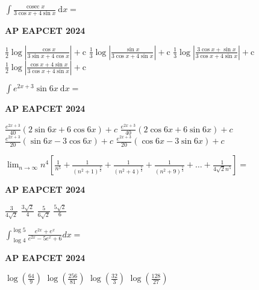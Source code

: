 \documentclass[11pt,paper=a4,answers]{exam}
\begin{document}
\begin{multicols}{2}
\begin{questions}
\question
$\int \frac{\operatorname{cosec} x}{3 \cos x+4 \sin x} \mathrm{~d} x=$
\begin{flushright}
\small\textbf{AP EAPCET 2024}
\end{flushright}
\begin{choices}
  \choice $\frac{1}{2} \log \left|\frac{\cos x}{3 \sin x+4 \cos x}\right|+\mathrm{c}$
  \choice $\frac{1}{3} \log \left|\frac{\sin x}{3 \cos x+4 \sin x}\right|+\mathrm{c}$ 
  \choice $\frac{1}{3} \log \left|\frac{3 \cos x+\sin x}{3 \cos x+4 \sin x}\right|+\mathrm{c} $ 
  \choice $\frac{1}{2} \log \left|\frac{\cos x+4 \sin x}{3 \cos x+4 \sin x}\right|+\mathrm{c}$
\end{choices}


\question
$\int e^{2 x+3} \sin 6 x \mathrm{~d} x=$
\begin{flushright}
\small\textbf{AP EAPCET 2024}
\end{flushright}
\begin{choices}
  \choice $\frac{e^{2 x+3}}{40}(2 \sin 6 x+6 \cos 6 x)+c$
  \choice $\frac{e^{2 x+3}}{40}(2 \cos 6 x+6 \sin 6 x)+c$ 
  \choice $\frac{e^{2 x+3}}{20}(\sin 6 x-3 \cos 6 x)+c$ 
  \choice $\frac{e^{2 x+3}}{20}(\cos 6 x-3 \sin 6 x)+c$
\end{choices}


\question
$\lim _{n \rightarrow \infty} n^4\left[\frac{1}{n^5}+\frac{1}{\left(n^2+1\right)^{\frac{5}{2}}}+\frac{1}{\left(n^2+4\right)^{\frac{5}{2}}}+\frac{1}{\left(n^2+9\right)^{\frac{5}{2}}}+\ldots+\frac{1}{4 \sqrt{2} n^5}\right]=$
\begin{flushright}
\small\textbf{AP EAPCET 2024}
\end{flushright}
\begin{choices}
  \choice $\frac{3}{4 \sqrt{2}}$
  \choice $\frac{3 \sqrt{2}}{4}$ 
  \choice $\frac{5}{6 \sqrt{2}}$ 
  \choice $\frac{5 \sqrt{2}}{6}$
\end{choices}

\question
$\int_{\log 4}^{\log 5} \frac{e^{2 x}+e^x}{e^{2 x}-5 e^x+6} d x=$
\begin{flushright}
\small\textbf{AP EAPCET 2024}
\end{flushright}
\begin{choices}
  \choice $ \log \left(\frac{64}{9}\right)$
  \choice $\log \left(\frac{256}{81}\right)$ 
  \choice $ \log \left(\frac{32}{3}\right)$ 
  \choice $\log \left(\frac{128}{27}\right)$
\end{choices}


\end{questions}
\end{multicols}
\end{document}
